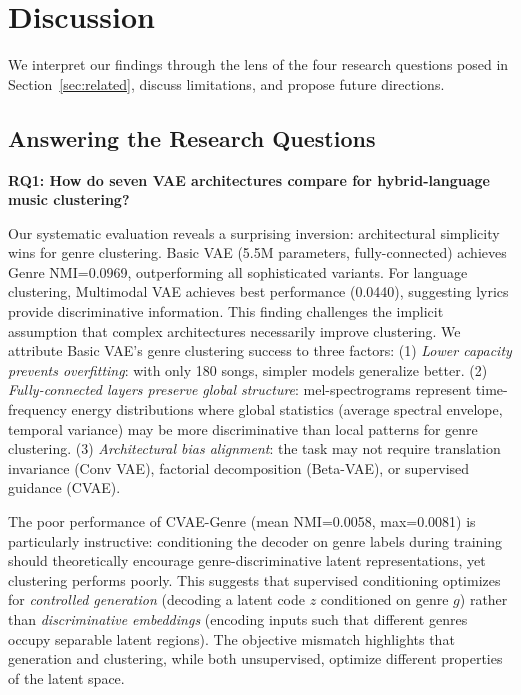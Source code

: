 \documentclass[10pt,twocolumn]{article}
\begin{document}
\section{Discussion}
\label{sec:discussion}

We interpret our findings through the lens of the four research questions posed in Section~\ref{sec:related}, discuss limitations, and propose future directions.

\subsection{Answering the Research Questions}

\textbf{RQ1: How do seven VAE architectures compare for hybrid-language music clustering?}

Our systematic evaluation reveals a surprising inversion: architectural simplicity wins for genre clustering. Basic VAE (5.5M parameters, fully-connected) achieves Genre NMI=0.0969, outperforming all sophisticated variants. For language clustering, Multimodal VAE achieves best performance (0.0440), suggesting lyrics provide discriminative information. This finding challenges the implicit assumption that complex architectures necessarily improve clustering. We attribute Basic VAE's genre clustering success to three factors: (1) \emph{Lower capacity prevents overfitting}: with only 180 songs, simpler models generalize better. (2) \emph{Fully-connected layers preserve global structure}: mel-spectrograms represent time-frequency energy distributions where global statistics (average spectral envelope, temporal variance) may be more discriminative than local patterns for genre clustering. (3) \emph{Architectural bias alignment}: the task may not require translation invariance (Conv VAE), factorial decomposition (Beta-VAE), or supervised guidance (CVAE).

The poor performance of CVAE-Genre (mean NMI=0.0058, max=0.0081) is particularly instructive: conditioning the decoder on genre labels during training should theoretically encourage genre-discriminative latent representations, yet clustering performs poorly. This suggests that supervised conditioning optimizes for \emph{controlled generation} (decoding a latent code $z$ conditioned on genre $g$) rather than \emph{discriminative embeddings} (encoding inputs such that different genres occupy separable latent regions). The objective mismatch highlights that generation and clustering, while both unsupervised, optimize different properties of the latent space.
\end{document}
